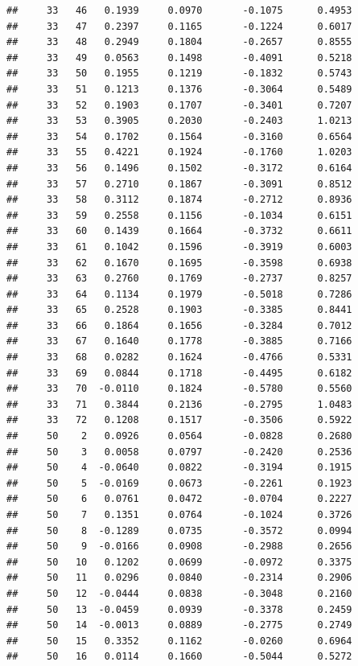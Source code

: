 \documentclass[
]{article}
\begin{document}
\begin{verbatim}
##     33   46   0.1939     0.0970       -0.1075      0.4953  
##     33   47   0.2397     0.1165       -0.1224      0.6017  
##     33   48   0.2949     0.1804       -0.2657      0.8555  
##     33   49   0.0563     0.1498       -0.4091      0.5218  
##     33   50   0.1955     0.1219       -0.1832      0.5743  
##     33   51   0.1213     0.1376       -0.3064      0.5489  
##     33   52   0.1903     0.1707       -0.3401      0.7207  
##     33   53   0.3905     0.2030       -0.2403      1.0213  
##     33   54   0.1702     0.1564       -0.3160      0.6564  
##     33   55   0.4221     0.1924       -0.1760      1.0203  
##     33   56   0.1496     0.1502       -0.3172      0.6164  
##     33   57   0.2710     0.1867       -0.3091      0.8512  
##     33   58   0.3112     0.1874       -0.2712      0.8936  
##     33   59   0.2558     0.1156       -0.1034      0.6151  
##     33   60   0.1439     0.1664       -0.3732      0.6611  
##     33   61   0.1042     0.1596       -0.3919      0.6003  
##     33   62   0.1670     0.1695       -0.3598      0.6938  
##     33   63   0.2760     0.1769       -0.2737      0.8257  
##     33   64   0.1134     0.1979       -0.5018      0.7286  
##     33   65   0.2528     0.1903       -0.3385      0.8441  
##     33   66   0.1864     0.1656       -0.3284      0.7012  
##     33   67   0.1640     0.1778       -0.3885      0.7166  
##     33   68   0.0282     0.1624       -0.4766      0.5331  
##     33   69   0.0844     0.1718       -0.4495      0.6182  
##     33   70  -0.0110     0.1824       -0.5780      0.5560  
##     33   71   0.3844     0.2136       -0.2795      1.0483  
##     33   72   0.1208     0.1517       -0.3506      0.5922  
##     50    2   0.0926     0.0564       -0.0828      0.2680  
##     50    3   0.0058     0.0797       -0.2420      0.2536  
##     50    4  -0.0640     0.0822       -0.3194      0.1915  
##     50    5  -0.0169     0.0673       -0.2261      0.1923  
##     50    6   0.0761     0.0472       -0.0704      0.2227  
##     50    7   0.1351     0.0764       -0.1024      0.3726  
##     50    8  -0.1289     0.0735       -0.3572      0.0994  
##     50    9  -0.0166     0.0908       -0.2988      0.2656  
##     50   10   0.1202     0.0699       -0.0972      0.3375  
##     50   11   0.0296     0.0840       -0.2314      0.2906  
##     50   12  -0.0444     0.0838       -0.3048      0.2160  
##     50   13  -0.0459     0.0939       -0.3378      0.2459  
##     50   14  -0.0013     0.0889       -0.2775      0.2749  
##     50   15   0.3352     0.1162       -0.0260      0.6964  
##     50   16   0.0114     0.1660       -0.5044      0.5272  

\end{verbatim}
\end{document}
